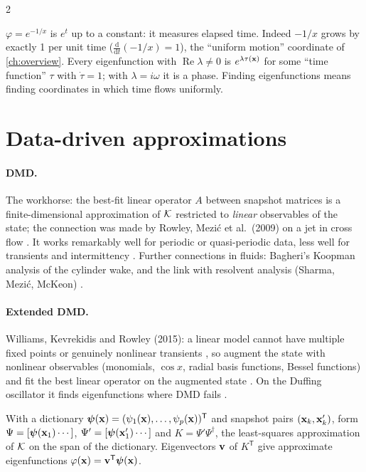 \begin{paracol}{2}
\begin{intuition}
$\varphi=e^{-1/x}$ is $e^{t}$ up to a constant: it measures elapsed time. Indeed $-1/x$ grows by exactly 1 per
unit time ($\frac{\mathrm d}{\mathrm dt}(-1/x)=1$), the ``uniform motion'' coordinate of \cref{ch:overview}.
Every eigenfunction with $\operatorname{Re}\lambda\ne0$ is $e^{\lambda\tau(\mathbf{x})}$ for some ``time function''
$\tau$ with $\dot\tau=1$; with $\lambda=i\omega$ it is a phase. Finding eigenfunctions means finding
coordinates in which time flows uniformly.
\end{intuition}


\section{Data-driven approximations}\label{sec:ko-data}

\paragraph{DMD.} The workhorse: the best-fit linear operator $A$ between snapshot matrices is a
finite-dimensional approximation of $\mathcal{K}$ restricted to \emph{linear} observables of the state; the
connection was made by Rowley, Mezi\'c et al.\ (2009) on a jet in cross flow
. It works remarkably well for periodic or
quasi-periodic data, less well for transients and intermittency . Further
connections in fluids: Bagheri's Koopman analysis of the cylinder wake, and the link with resolvent analysis
(Sharma, Mezi\'c, McKeon) .

\paragraph{Extended DMD.} Williams, Kevrekidis and Rowley (2015): a linear model cannot have multiple fixed
points or genuinely nonlinear transients , so augment the state with nonlinear observables
(monomials, $\cos x$, radial basis functions, Bessel functions) and fit the best linear operator on the
augmented state . On the Duffing oscillator it finds eigenfunctions where DMD
fails .
\begin{definition}
With a dictionary $\boldsymbol\psi(\mathbf{x})=(\psi_1(\mathbf{x}),\dots,\psi_p(\mathbf{x}))^{\mathsf T}$ and snapshot pairs
$(\mathbf{x}_k,\mathbf{x}_k')$, form $\Psi=[\boldsymbol\psi(\mathbf{x}_1)\cdots]$, $\Psi'=[\boldsymbol\psi(\mathbf{x}_1')\cdots]$
and $K=\Psi'\Psi^\dagger$, the least-squares approximation of $\mathcal{K}$ on the span of the dictionary. Eigenvectors
$\mathbf{v}$ of $K^{\mathsf T}$ give approximate eigenfunctions $\varphi(\mathbf{x})=\mathbf{v}^{\mathsf T}\boldsymbol\psi(\mathbf{x})$.
\end{definition}


\end{paracol}
